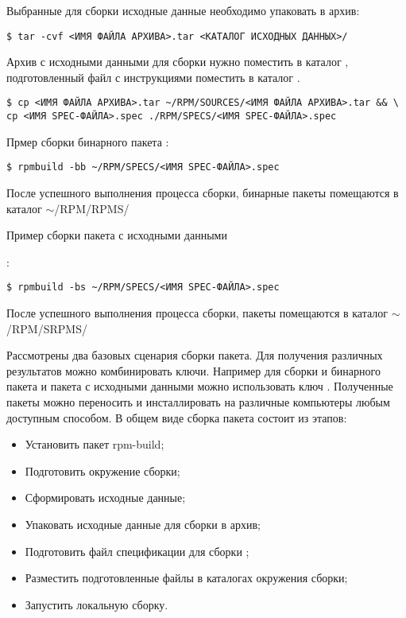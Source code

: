 Выбранные для сборки исходные данные необходимо упаковать в  архив:

\begin{verbatim}
$ tar -cvf <ИМЯ ФАЙЛА АРХИВА>.tar <КАТАЛОГ ИСХОДНЫХ ДАННЫХ>/
\end{verbatim}

Архив с исходными данными для сборки нужно поместить в каталог ,
подготовленный  файл с инструкциями поместить в каталог .

\begin{verbatim}
$ cp <ИМЯ ФАЙЛА АРХИВА>.tar ~/RPM/SOURCES/<ИМЯ ФАЙЛА АРХИВА>.tar && \
cp <ИМЯ SPEC-ФАЙЛА>.spec ./RPM/SPECS/<ИМЯ SPEC-ФАЙЛА>.spec
\end{verbatim}

Прмер сборки бинарного пакета :
\begin{verbatim}
$ rpmbuild -bb ~/RPM/SPECS/<ИМЯ SPEC-ФАЙЛА>.spec
\end{verbatim}
После успешного выполнения процесса сборки, бинарные пакеты  помещаются в каталог $\sim$/RPM/RPMS/

\hypertarget{rpmbuild-exampl-src}{Пример сборки пакета с исходными данными }:
\begin{verbatim}
$ rpmbuild -bs ~/RPM/SPECS/<ИМЯ SPEC-ФАЙЛА>.spec
\end{verbatim}
После успешного выполнения процесса сборки, пакеты  помещаются в каталог $\sim$/RPM/SRPMS/

Рассмотрены два базовых сценария сборки пакета. Для получения различных результатов можно комбинировать ключи.
Например для сборки и бинарного пакета и пакета с исходными данными можно использовать ключ \Sys{-ba}.
Полученные пакеты можно переносить и инсталлировать на различные компьютеры любым доступным способом.
В общем виде сборка пакета состоит из этапов:
\begin{itemize}
\item Установить пакет rpm-build;
\item Подготовить окружение сборки;
\item Сформировать исходные данные;
\item Упаковать исходные данные для сборки в  архив;
\item Подготовить файл спецификации для сборки ;
\item Разместить подготовленные файлы в каталогах окружения сборки;
\item Запустить локальную сборку.
\end{itemize}


